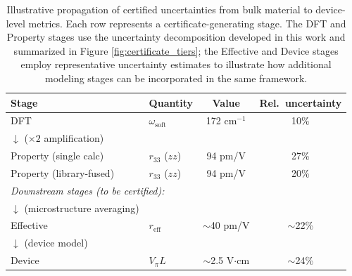 \documentclass[prb,twocolumn,superscriptaddress,amsmath,amssymb,longbibliography]{revtex4-2}
\begin{document}
\begin{table}
\centering
\caption{Illustrative propagation of certified uncertainties from bulk material to device-level metrics. Each row represents a certificate-generating stage. The DFT and Property stages use the uncertainty decomposition developed in this work and summarized in   Figure \ref{fig:certificate_tiers}; the Effective and Device stages employ representative uncertainty estimates to illustrate how additional modeling stages can be incorporated in the same framework. }
\label{tab:propagation}
\begin{tabular}{llcc}
\toprule
Stage & Quantity & Value & Rel.\ uncertainty \\
\midrule
DFT & $\omega_{\mathrm{soft}}$ & 172 cm$^{-1}$ & 10\% \\
$\downarrow$ ($\times 2$ amplification) & & & \\
Property (single calc) & $r_{33}$ ($zz$) & 94 pm/V & 27\% \\
Property (library-fused) & $r_{33}$ ($zz$) & 94 pm/V & 20\% \\
\midrule
\multicolumn{4}{l}{\textit{Downstream stages (to be certified):}} \\
$\downarrow$ (microstructure averaging) & & & \\
Effective & $r_{\mathrm{eff}}$ & $\sim$40 pm/V & $\sim$22\% \\
$\downarrow$ (device model) & & & \\
Device & $V_\pi L$ & $\sim$2.5 V$\cdot$cm & $\sim$24\% \\
\bottomrule
\end{tabular}
\end{table}
\end{document}
